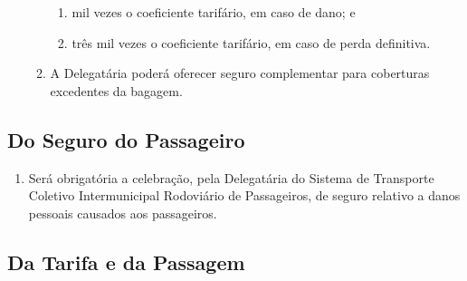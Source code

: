 \begin{enumerate}[resume, label=Art. \arabic*]
\begin{enumerate}[label= \S \arabic*]
\begin{enumerate}[label=\roman*.]

\item mil vezes o coeficiente tarifário, em caso de dano; e

\item três mil vezes o coeficiente tarifário, em caso de perda definitiva.

\end{enumerate}

\item A Delegatária poderá oferecer seguro complementar para coberturas excedentes da bagagem.

\end{enumerate}

\end{enumerate}

\subsection{Do Seguro do Passageiro}

\begin{enumerate}[resume, label=Art. \arabic*]

\item Será obrigatória a celebração, pela Delegatária do Sistema de Transporte Coletivo Intermunicipal Rodoviário de Passageiros, de seguro relativo a danos pessoais causados aos passageiros.

\end{enumerate}

\subsection{Da Tarifa e da Passagem}

